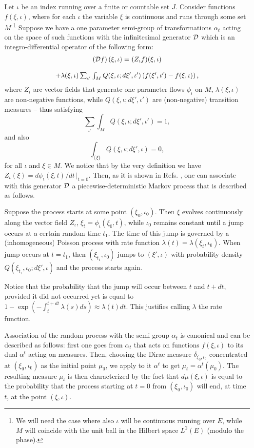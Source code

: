 \documentclass[12pt]{article}
\def\be{\begin{equation}}
\def\ee{\end{equation}}
\def\ba{\begin{array}}
\def\ea{\end{array}}
\begin{document}
Let $\iota$ be an index running over a finite or countable set $J$.
Consider functions $f(\xi ,\iota)$, where for each $\iota$ the variable
$\xi $ is continuous and runs through some set $M$ \footnote{We will need
the case where also $\iota$ will be continuous running over $E$, while $M$
will coincide with the unit ball in the Hilbert space $L^2(E)$ (modulo the
phase).} Suppose we have a one parameter semi-group of transformations
$\alpha_t$ acting on the space of such functions with the infinitesimal
generator ${\cal D}$ which is an integro-differential operator of the
following form: \be \ba{c} \left({\cal D}f\right)(\xi,\iota) =(Z_\iota
f)(\xi,\iota)\cr\cr + \lambda(\xi,\iota)\sum_{\iota'} \int_M
Q(\xi,\iota;d\xi',\iota') \left( f(\xi',\iota')-f(\xi,\iota)\right)
,\label{eq:gen} \ea \ee where $Z_\iota$ are vector fields that generate
one parameter flows $\phi_\iota$ on $M$, $\lambda(\xi,\iota)$ are
non-negative functions, while $ Q(\xi,\iota;d\xi',\iota')$ are
(non-negative) transition measures -- thus satisfying \be \sum_{\iota'}
\int_M Q(\xi,\iota;d\xi',\iota') =1 , \ee and also \be
\int_{\{\xi\}}Q(\xi,\iota;d\xi',\iota)=0 , \ee for all $\iota$ and $\xi\in
M$. We notice that by the very definition we have $Z_\iota(\xi)=
d\phi_\iota(\xi,t)/dt\, \vert_{t=0}$. Then, as it is shown in Refs.
\cite{davmha1,davmha2}, one can associate with this generator ${\cal D}$ a
piecewise-deterministic Markov process that is described as follows.

Suppose the process starts at some point $(\xi_0 ,\iota_0 )$. Then $\xi$
evolves continuously along the vector field $Z_\iota$,
$\xi_t=\phi_\iota(\xi_0,t)$, while $\iota_0$ remains constant until a jump
occurs at a certain random time $t_1$. The time of this jump is governed by
a (inhomogeneous) Poisson process with rate function
$\lambda(t)=\lambda(\xi_t,\iota_0)$. When jump occurs at $t=t_1$, then
$(\xi_{t_1},\iota_0)$ jumps to $(\xi',\iota)$ with probability density
$Q(\xi_{t_1},\iota_0;d\xi', \iota)$ and the process starts again.

\medskip
{} Notice that the probability that the jump will occur between
$t$ and $t+dt$, provided it did not occurred yet is equal to
$1-\exp\left(-\int_t^{t+dt}\lambda(s)ds\right)\approx\lambda(t)dt$. This
justifies calling $\lambda$ the rate function.

\medskip
Association of the random process with the semi-group $\alpha_t$ is
canonical and can be described as follows: first one goes from $\alpha_t$
that acts on functions $f(\xi,\iota)$ to its dual $\alpha^t$ acting on
measures. Then, choosing the Dirac measure $\delta_{\xi_0,\iota_0}$
concentrated at $(\xi_0,\iota_0)$ as the initial point $\mu_0$, we apply to
it $\alpha^t$ to get $\mu_t=\alpha^t(\mu_0)$. The resulting measure $\mu_t$
is then characterized by the fact that $d\mu(\xi,\iota)$ is equal to the
probability that the process starting at $t=0$ from $(\xi_0,\iota_0)$ will
end, at time $t$, at the point $(\xi,\iota)$.
\end{document}
